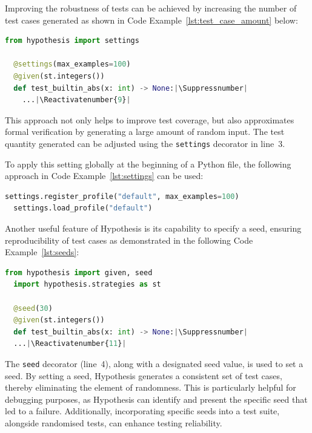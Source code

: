 \documentclass[runningheads]{llncs}
\makeatletter
\let\origthelstnumber\thelstnumber
\newcommand*\Suppressnumber{%
  \lst@AddToHook{OnNewLine}{%
    \let\thelstnumber\relax%
     \advance\c@lstnumber-\@ne\relax%
    }%
}
\newcommand*\Reactivatenumber[1]{%
  \setcounter{lstnumber}{\numexpr#1-1\relax}
  \lst@AddToHook{OnNewLine}{%
   \let\thelstnumber\origthelstnumber%
   \refstepcounter{lstnumber}%
  }%
}
\makeatother
\begin{document}
\vspace{5mm}
\noindent Improving the robustness of tests can be achieved by increasing the number of test cases generated as shown in Code Example~\ref{lst:test_case_amount} below:

\begin{lstlisting}[language=Python,caption={Specifying Test Case Amount from \texttt{tutorial.ipynb}},label=lst:test_case_amount]
  from hypothesis import settings

  @settings(max_examples=100)
  @given(st.integers())
  def test_builtin_abs(x: int) -> None:|\Suppressnumber|
    ...|\Reactivatenumber{9}|

\end{lstlisting}
This approach not only helps to improve test coverage, but also approximates formal verification by generating a large amount of random input. The test quantity generated can be adjusted using the \texttt{settings} decorator in line~3.

To apply this setting globally at the beginning of a Python file, the following approach in Code Example~\ref{lst:settings} can be used:

\begin{lstlisting}[language=Python,caption={Global Settings from \texttt{tutorial.ipynb}},label=lst:settings]
  settings.register_profile("default", max_examples=100)
  settings.load_profile("default")
\end{lstlisting}

\vspace{5mm}
\noindent Another useful feature of Hypothesis is its capability to specify a seed, ensuring reproducibility of test cases as demonstrated in the following Code Example~\ref{lst:seeds}:

\begin{lstlisting}[language=Python,caption={Specifying Seeds from \texttt{tutorial.ipynb}},label=lst:seeds]
  from hypothesis import given, seed
  import hypothesis.strategies as st

  @seed(30)
  @given(st.integers())
  def test_builtin_abs(x: int) -> None:|\Suppressnumber|
  ...|\Reactivatenumber{11}|

\end{lstlisting}
The \texttt{seed} decorator (line~4), along with a designated seed value, is used to set a seed. By setting a seed, Hypothesis generates a consistent set of test cases, thereby eliminating the element of randomness. This is particularly helpful for debugging purposes, as Hypothesis can identify and present the specific seed that led to a failure. Additionally, incorporating specific seeds into a test suite, alongside randomised tests, can enhance testing reliability. 
\end{document}

